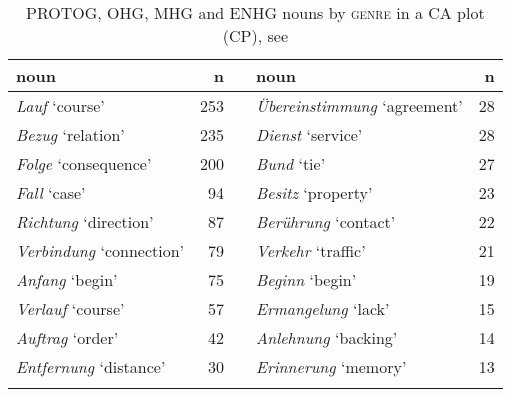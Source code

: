 \documentclass[output=paper,colorlinks,citecolor=brown]{langscibook}
\begin{document}
\begin{table}
\begin{tabularx}{\textwidth}{lr X lr}
\lsptoprule
{noun} &  n && noun & n\\
\midrule
\textit{Lauf} ‘course' & 253  &&           \textit{Übereinstimmung} ‘agreement' & 28\\
\textit{Bezug} ‘relation' & 235  &&        \textit{Dienst} ‘service' & 28\\
\textit{Folge} ‘consequence' & 200  &&     \textit{Bund} ‘tie' & 27\\
\textit{Fall} ‘case' & 94  &&              \textit{Besitz} ‘property' & 23\\
\textit{Richtung} ‘direction' & 87  &&     \textit{Berührung} ‘contact' & 22\\
\textit{Verbindung} ‘connection' & 79  &&  \textit{Verkehr} ‘traffic' & 21\\
\textit{Anfang} ‘begin' & 75  &&           \textit{Beginn} ‘begin' & 19\\
\textit{Verlauf} ‘course' & 57  &&         \textit{Ermangelung} ‘lack' & 15\\
\textit{Auftrag} ‘order' & 42  &&          \textit{Anlehnung} ‘backing' & 14\\
\textit{Entfernung} ‘distance' & 30  &&    \textit{Erinnerung} ‘memory' & 13\\
\lspbottomrule
\end{tabularx}
\caption{PROTOG, OHG, MHG and ENHG nouns by \textsc{genre} in a CA plot (CP), see }
\label{tab:fleissner:tofig9}
\end{table}
\end{document}
